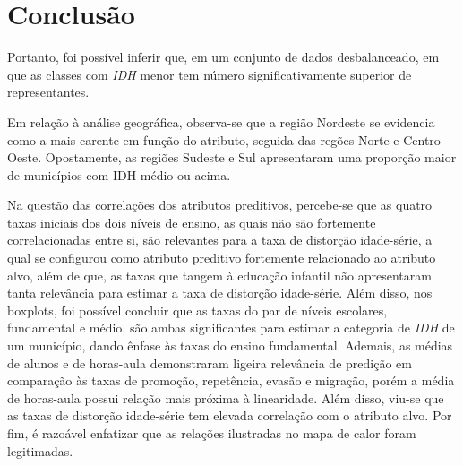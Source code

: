 \section{Conclusão}

\par Portanto, foi possível inferir que, em um conjunto de dados desbalanceado, em que as classes com \textit{IDH} menor tem número significativamente superior de representantes. 

\par Em relação à análise geográfica, observa-se que a região Nordeste se evidencia como a mais carente em função do atributo, seguida das regões Norte e Centro-Oeste. Opostamente, as regiões Sudeste e Sul apresentaram uma proporção maior de municípios com IDH médio ou acima.

\par Na questão das correlações dos atributos preditivos, percebe-se que as quatro taxas iniciais dos dois níveis de ensino, as quais não são fortemente correlacionadas entre si, são relevantes para a taxa de distorção idade-série, a qual se configurou como atributo preditivo fortemente relacionado ao atributo alvo, além de que, as taxas que tangem à educação infantil não apresentaram tanta relevância para estimar a taxa de distorção idade-série. Além disso, nos boxplots, foi possível concluir que as taxas do par de níveis escolares, fundamental e médio, são ambas significantes para estimar a categoria de \textit{IDH} de um município, dando ênfase às taxas do ensino fundamental. Ademais, as médias de alunos e de horas-aula demonstraram ligeira relevância de predição em comparação às taxas de promoção, repetência, evasão e migração, porém a média de horas-aula possui relação mais próxima à linearidade. Além disso, viu-se que as taxas de distorção idade-série tem elevada correlação com o atributo alvo. Por fim, é razoável enfatizar que as relações ilustradas no mapa de calor foram legitimadas.